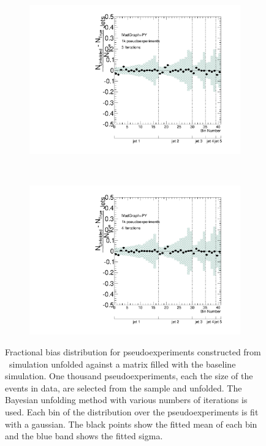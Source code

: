 \begin{figure}
\begin{subfigure}[]{0.5\textwidth}
\includegraphics[width=\textwidth]{fig/Stress/110872atlfast/FracBias3Iterations.pdf}
\end{subfigure}
~
\begin{subfigure}[]{0.5\textwidth}
\includegraphics[width=\textwidth]{fig/Stress/110872atlfast/FracBias4Iterations.pdf}
\end{subfigure}
\caption{Fractional bias distribution for pseudoexperiments constructed from \newline \madpy\ simulation unfolded against a matrix filled with the baseline simulation. One thousand pseudoexperiments, each the size of the events in data, are selected from the sample and unfolded. The Bayesian unfolding method with various numbers of iterations is used. Each bin of the distribution over the pseudoexperiments is fit with a gaussian. The black points show the fitted mean of each bin and the blue band shows the fitted sigma.}
\label{fig:p8frbias}
\end{figure}
